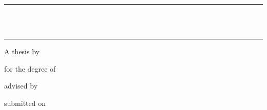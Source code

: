 \begin{titlepage}
  
  \begin{center}
    \begin{minipage}{\textwidth}
      \centering
      \rule{\linewidth}{0.2mm} \\[6mm]
      { \LARGE \bfseries \thesistitle } \\[2mm]
      \rule{\linewidth}{0.2mm}
    \end{minipage}
  \end{center}

  \vspace{16mm}

  \begin{center}
    \begin{minipage}[t]{\textwidth}
      \centering
      {\small A thesis by} \\
      {\large \textbf{\thesisauthor}}
    \end{minipage}
  \end{center}

  \vspace{20mm}

  \begin{center}
    \begin{minipage}[t]{\textwidth}
      \centering
      {\small for the degree of} \\
      {\large \thesisdegree}
    \end{minipage}
  \end{center}
  
  \vspace{2mm}
  
  \begin{center}
    \begin{minipage}[t]{\textwidth}
      \centering
      {\small advised by} \\
      \thesisadvisor
    \end{minipage}
  \end{center}

  \vspace{2mm}

  \begin{center}
    \begin{minipage}[t]{\textwidth}
      \centering
      {\small submitted on} \\
      \thesisdate
    \end{minipage}
  \end{center}


\end{titlepage}

